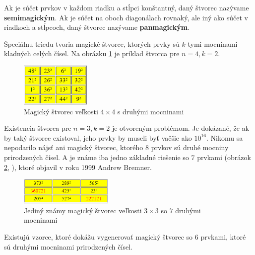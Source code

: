 \begin{note} Ak je súčet prvkov v každom riadku a stĺpci konštantný, daný štvorec nazývame \textbf{semimagickým}. Ak je súčet na oboch diagonálach rovnaký, ale iný ako súčet v riadkoch a stĺpcoch, daný štvorec nazývame \textbf{panmagickým}.
\end{note}

Špeciálnu triedu tvoria magické štvorce, ktorých prvky sú $k$-tymi mocninami kladných celých čísel. Na obrázku \ref{obr:fig_squared_magic_4x4} je príklad štvorca pre $n = 4, k = 2$.

\begin{figure}[H]
\centerline{\includegraphics[width=0.3\textwidth]{images/squared_magic_4x4}}
\caption[Magický štvorec veľkosti $4 \times 4$ s druhými mocninami]{Magický štvorec veľkosti $4 \times 4$ s druhými mocninami \cite{multimagie}}
\label{obr:fig_squared_magic_4x4}
\end{figure}

Existencia štvorca pre $n = 3, k = 2$ je otvoreným problémom. Je dokázané, že ak by taký štvorec existoval, jeho prvky by museli byť vačšie ako $10^{16}$. Nikomu sa nepodarilo nájsť ani magický štvorec, ktorého $8$ prvkov sú druhé mocniny prirodzených čísel. A je známe iba jedno základné riešenie so $7$ prvkami (obrázok \ref{obr:fig_bremner_magic_3x3}, \cite{multimagie}), ktoré objavil v roku 1999 Andrew Bremner.

\begin{figure}[H]
\centerline{\includegraphics[width=0.4\textwidth]{images/bremner_magic_3x3}}
\caption[Magický štvorec veľkosti $3 \times 3$ so $7$ druhými mocninami]{Jediný známy magický štvorec veľkosti $3 \times 3$ so $7$ druhými mocninami \cite{multimagie}}
\label{obr:fig_bremner_magic_3x3}
\end{figure}

\begin{note} Existujú vzorce, ktoré dokážu vygenerovať magický štvorec so $6$ prvkami, ktoré sú druhými mocninami prirodzených čísel.
\end{note}

